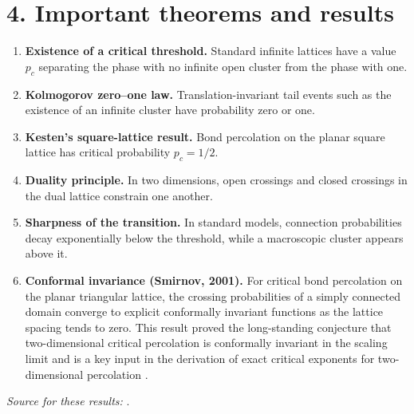 \section*{4. Important theorems and results}
\begin{enumerate}[leftmargin=*,itemsep=0.35em]
\item \textbf{Existence of a critical threshold.} Standard infinite lattices have a value $p_c$ separating the phase with no infinite open cluster from the phase with one.

\item \textbf{Kolmogorov zero--one law.} Translation-invariant tail events such as the existence of an infinite cluster have probability zero or one.

\item \textbf{Kesten's square-lattice result.} Bond percolation on the planar square lattice has critical probability $p_c=1/2$.

\item \textbf{Duality principle.} In two dimensions, open crossings and closed crossings in the dual lattice constrain one another.

\item \textbf{Sharpness of the transition.} In standard models, connection probabilities decay exponentially below the threshold, while a macroscopic cluster appears above it.

\item \textbf{Conformal invariance (Smirnov, 2001).} For critical bond percolation on the planar triangular lattice, the crossing probabilities of a simply connected domain converge to explicit conformally invariant functions as the lattice spacing tends to zero. This result proved the long-standing conjecture that two-dimensional critical percolation is conformally invariant in the scaling limit and is a key input in the derivation of exact critical exponents for two-dimensional percolation \cite{percolation_ref1,percolation_ref2}.
\end{enumerate}
\noindent\emph{Source for these results:} \cite{percolation_ref1}.

